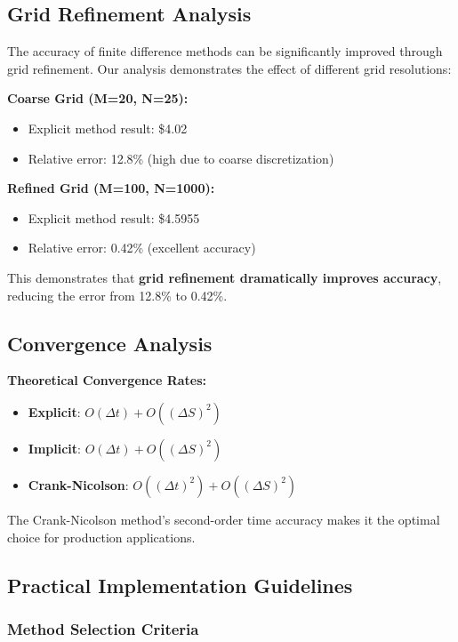 \documentclass[12pt,a4paper]{article}
\numberwithin{algorithm}{subsection}
\begin{document}
\subsection{Grid Refinement Analysis}

The accuracy of finite difference methods can be significantly improved through grid refinement. Our analysis demonstrates the effect of different grid resolutions:

\textbf{Coarse Grid (M=20, N=25):}
\begin{itemize}
\item Explicit method result: \$4.02
\item Relative error: 12.8\% (high due to coarse discretization)
\end{itemize}

\textbf{Refined Grid (M=100, N=1000):}
\begin{itemize}
\item Explicit method result: \$4.5955
\item Relative error: 0.42\% (excellent accuracy)
\end{itemize}

This demonstrates that \textbf{grid refinement dramatically improves accuracy}, reducing the error from 12.8\% to 0.42\%.

\subsection{Convergence Analysis}

\textbf{Theoretical Convergence Rates:}
\begin{itemize}
\item \textbf{Explicit}: $O(\Delta t) + O((\Delta S)^2)$
\item \textbf{Implicit}: $O(\Delta t) + O((\Delta S)^2)$
\item \textbf{Crank-Nicolson}: $O((\Delta t)^2) + O((\Delta S)^2)$
\end{itemize}

The Crank-Nicolson method's second-order time accuracy makes it the optimal choice for production applications.

\subsection{Practical Implementation Guidelines}

\subsubsection{Method Selection Criteria}
\end{document}

